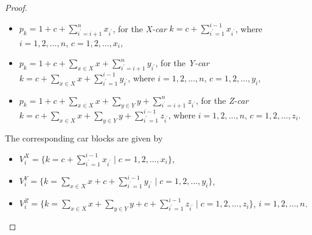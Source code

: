 \documentclass[12pt]{article}
\begin{document}
\begin{proof}
\begin{itemize}[topsep=2pt]
        \item $p_k=1+c+\sum_{i^{\prime}=i+1}^{n}{x_{i^{\prime}}}$, for the \textit{X-car} $k=c+\sum_{i^{\prime}=1}^{i-1}{x_{i^{\prime}}}$, where $i=1,2,\dots, n$, $c=1,2,\dots,x_i$,

        \item $p_k=1+c+\sum_{x\in X}{x}+\sum_{i^{\prime}=i+1}^{n}{y_{i^{\prime}}}$, for the \textit{Y-car} $k=c+\sum_{x\in X}{x}+\sum_{i^{\prime}=1}^{i-1}{y_{i^{\prime}}}$, where $i=1,2,\dots,n$, $c=1,2,\dots,y_i$,

        \item $p_k=1+c+\sum_{x\in X}{x}+\sum_{y\in Y}{y}+\sum_{i^{\prime}=i+1}^{n}{z_{i^{\prime}}}$, for the \textit{Z-car} $k=c+\sum_{x\in X}{x}+\sum_{y\in Y}{y}+\sum_{i^{\prime}=1}^{i-1}{z_{i^{\prime}}}$, where $i=1,2,\dots,n$, $c=1,2,\dots,z_i$.



    \end{itemize}





    The corresponding car blocks are given by
    \begin{itemize}[topsep=2pt]
        \item $V^X_i=\{k=c+\sum_{i^{\prime}=1}^{i-1}{x_{i^{\prime}}}\mid c=1,2,\dots,x_i\}$,
        \item $V^Y_i=\{k=\sum_{x\in X}{x}+c+\sum_{i^{\prime}=1}^{i-1}{y_{i^{\prime}}}\mid c=1,2,\dots,y_i\}$,
        \item $V^Z_i=\{k=\sum_{x\in X}{x}+\sum_{y\in Y}{y}+c+\sum_{i^{\prime}=1}^{i-1}{z_{i^{\prime}}}\mid c=1,2,\dots,z_i\}$, $i=1,2,\dots,n$.
    \end{itemize}


\end{proof}
\end{document}
